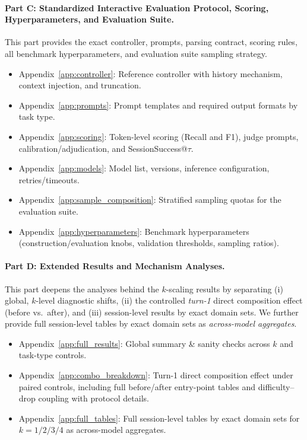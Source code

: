 \paragraph{Part C: Standardized Interactive Evaluation Protocol, Scoring, Hyperparameters, and Evaluation Suite.}
This part provides the exact controller, prompts, parsing contract, scoring rules, all benchmark hyperparameters, and evaluation suite sampling strategy.
\begin{itemize}
    \item Appendix~\ref{app:controller}: Reference controller with history mechanism, context injection, and truncation.
    \item Appendix~\ref{app:prompts}: Prompt templates and required output formats by task type.
    \item Appendix~\ref{app:scoring}: Token-level scoring (Recall and F1), judge prompts, calibration/adjudication, and SessionSuccess@$\tau$.
    \item Appendix~\ref{app:models}: Model list, versions, inference configuration, retries/timeouts.
    \item Appendix~\ref{app:sample_composition}: Stratified sampling quotas for the evaluation suite.
    \item Appendix~\ref{app:hyperparameters}: Benchmark hyperparameters (construction/evaluation knobs, validation thresholds, sampling ratios).
\end{itemize}

\paragraph{Part D: Extended Results and Mechanism Analyses.}
This part deepens the analyses behind the $k$-scaling results by separating (i) global, $k$-level diagnostic shifts,
(ii) the controlled \emph{turn-1} direct composition effect (before vs.\ after), and
(iii) session-level results by exact domain sets.
We further provide full session-level tables by exact domain sets as \emph{across-model aggregates}.
\begin{itemize}
    \item Appendix~\ref{app:full_results}: Global summary \& sanity checks across $k$ and task-type controls.
    \item Appendix~\ref{app:combo_breakdown}: Turn-1 direct composition effect under paired controls, including full before/after entry-point tables and difficulty--drop coupling with protocol details.
    \item Appendix~\ref{app:full_tables}: Full session-level tables by exact domain sets for $k{=}1/2/3/4$ as across-model aggregates.
\end{itemize}



